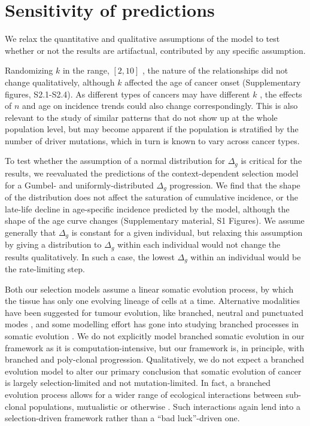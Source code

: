 \documentclass[12pt,onecolumn,twoside]{article}
\begin{document}
\section{Sensitivity of predictions}
We relax the quantitative and qualitative assumptions of the model to test whether or not the results are artifactual, contributed by any specific assumption.

Randomizing $k$ in the range, $[2, 10]$ \autocite{Martincorena2017}, the nature of the relationships did not change qualitatively, although $k$ affected the age of cancer onset (Supplementary figures, S2.1-S2.4). As different types of cancers may have different $k$ \autocite{Nunney2015}, the effects of $n$ and age on incidence trends could also change correspondingly. This is also relevant to the study of similar patterns that do not show up at the whole population level, but may become apparent if the population is stratified by the number of driver mutations, which in turn is known to vary across cancer types.

To test whether the assumption of a normal distribution for $\Delta_{g}$ is critical for the results, we reevaluated the predictions of the context-dependent selection model for a Gumbel- and uniformly-distributed $\Delta_{g}$ progression. We find that the shape of the distribution does not affect the saturation of cumulative incidence, or the late-life decline in age-specific incidence predicted by the model, although the shape of the age curve changes (Supplementary material, S1 Figures). We assume generally that $\Delta_{g}$ is constant for a given individual, but relaxing this assumption by giving a distribution to $\Delta_{g}$ within each individual would not change the results qualitatively. In such a case, the lowest $\Delta_{g}$ within an individual would be the rate-limiting step.

Both our selection models assume a linear somatic evolution process, by which the tissue has only one evolving lineage of cells at a time. Alternative modalities have been suggested for tumour evolution, like branched, neutral and punctuated modes \autocite{Davis2017a}, and some modelling effort has gone into studying branched processes in somatic evolution \autocite{Chowell2018}. We do not explicitly model branched somatic evolution in our framework as it is computation-intensive, but our framework is, in principle, with branched and poly-clonal progression. Qualitatively, we do not expect a branched evolution model to alter our primary conclusion that somatic evolution of cancer is largely selection-limited and not mutation-limited. In fact, a branched evolution process allows for a wider range of ecological interactions between sub-clonal populations, mutualistic or otherwise \autocite{Aktipis2013, Kareva2011}. Such interactions again lend into a selection-driven framework rather than a ``bad luck''-driven one.
\end{document}
